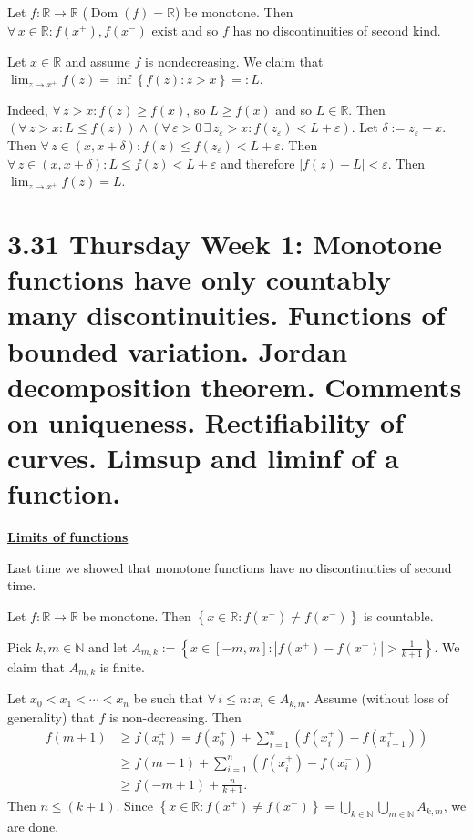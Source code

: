 \documentclass{notes}
\begin{document}
  \begin{lem}
    Let $f \colon \mathbb R \to \mathbb R$ ($\operatorname{Dom}(f) = \mathbb R$) be monotone.
    Then $\forall \, x \in \mathbb R: \text{$f(x^+), f(x^-)$ exist}$ and so $f$ has no discontinuities of second kind.
  \end{lem}
  
  \begin{prf}
    Let $x \in \mathbb R$ and assume $f$ is nondecreasing.
    We claim that $\lim_{z \to x^+} f(z) = \inf \left \{ f(z) : z > x \right \}=: L$.

    Indeed, $\forall \, z > x: f(z) \geq f(x)$, so $L \geq f(x)$ and so $L \in \mathbb R$.
    Then $(\forall \, z > x: L \leq f(z)) \land (\forall \, \varepsilon > 0 \, \exists \, z_\varepsilon  > x: f(z_\varepsilon) < L + \varepsilon)$.
    Let $\delta := z_\varepsilon - x$.
    Then $\forall \, z \in (x, x + \delta): f(z) \leq f(z_\varepsilon) < L + \varepsilon$.
    Then $\forall \, z \in (x, x + \delta): L \leq f(z) < L + \varepsilon$ and therefore $\left | f(z) - L \right | < \varepsilon$.
    Then $\lim_{z \to x^+} f(z) = L$.
  \end{prf}
  
  \section{3.31 Thursday Week 1: Monotone functions have only countably many discontinuities. Functions of bounded variation. Jordan decomposition theorem. Comments on uniqueness. Rectifiability of curves. Limsup and liminf of a function.}
  
  \underline{\boldmath \bfseries Limits of functions}
  
  Last time we showed that monotone functions have no discontinuities of second time.

  \begin{lem}
    Let $f \colon \mathbb R \to \mathbb R$ be monotone.
    Then $\left \{ x \in \mathbb R : f(x^+) \neq f(x^-) \right \}$ is countable.
  \end{lem}
  
  \begin{prf}
    Pick $k, m \in \mathbb N$ and let $A_{m, k} := \left \{ x \in [-m, m] : \left | f(x^+) - f(x^-) \right | > \frac{1}{k + 1} \right \}$.
    We claim that $A_{m, k}$ is finite.
    
    Let $x_{0} < x_{1} < \cdots < x_n$ be such that $\forall \, i \leq n: x_i \in A_{k, m}$.
    Assume (without loss of generality) that $f$ is non-decreasing.
    Then 
    \begin{align}
      f(m + 1) &\geq f(x_n^+) = f(x_0^+) + \sum_{i = 1}^n \left ( f(x_i^+) - f(x_{i - 1}^+) \right ) \nonumber \\ 
      &\geq f(m - 1) + \sum_{i = 1}^n \left ( f(x_i^+) - f(x_i^-) \right ) \nonumber \\ 
      &\geq f(-m + 1) + \frac{n}{k + 1}.
    \end{align}
    Then $n \leq (k + 1)$.
    Since $\left \{ x \in \mathbb R : f(x^+) \neq f(x^-) \right \} = \bigcup_{k \in \mathbb N} \bigcup_{m \in \mathbb N} A_{k, m}$, we are done.
  \end{prf}
  
\end{document}
